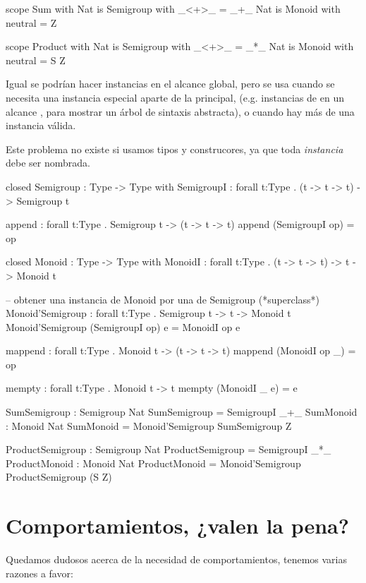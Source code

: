 {\begin{designfr}
\begin{anglercode}
scope Sum with
    Nat is Semigroup with
        _<+>_ = _+_
    Nat is Monoid with
        neutral = Z

scope Product with
    Nat is Semigroup with
        _<+>_ = _*_
    Nat is Monoid with
        neutral = S Z
\end{anglercode}

Igual se podrían hacer instancias en el alcance global, pero se usa cuando se necesita una instancia especial aparte de la principal, (e.g. instancias de  en un alcance , para mostrar un árbol de sintaxis abstracta), o cuando hay más de una instancia válida.

Este problema no existe si usamos tipos y construcores, ya que toda \emph{instancia} debe ser nombrada.

\begin{anglercode}
closed Semigroup : Type -> Type with
    SemigroupI : forall t:Type . (t -> t -> t) -> Semigroup t

append : forall t:Type . Semigroup t -> (t -> t -> t)
append (SemigroupI op) = op

closed Monoid : Type -> Type with
    MonoidI : forall t:Type . (t -> t -> t) -> t -> Monoid t

-- obtener una instancia de Monoid por una de Semigroup (*superclass*)
Monoid'Semigroup : forall t:Type . Semigroup t -> t -> Monoid t
Monoid'Semigroup (SemigroupI op) e = MonoidI op e

mappend : forall t:Type . Monoid t -> (t -> t -> t)
mappend (MonoidI op _) = op

mempty : forall t:Type . Monoid t -> t
mempty (MonoidI _ e) = e

SumSemigroup : Semigroup Nat
SumSemigroup = SemigroupI _+_
SumMonoid : Monoid Nat
SumMonoid = Monoid'Semigroup SumSemigroup Z

ProductSemigroup : Semigroup Nat
ProductSemigroup = SemigroupI _*_
ProductMonoid : Monoid Nat
ProductMonoid = Monoid'Semigroup ProductSemigroup (S Z)
\end{anglercode}
\end{designfr}

\section{Comportamientos, ¿valen la pena?}

\begin{designfr}
Quedamos dudosos acerca de la necesidad de comportamientos, tenemos varias razones a favor:


\end{designfr}}
